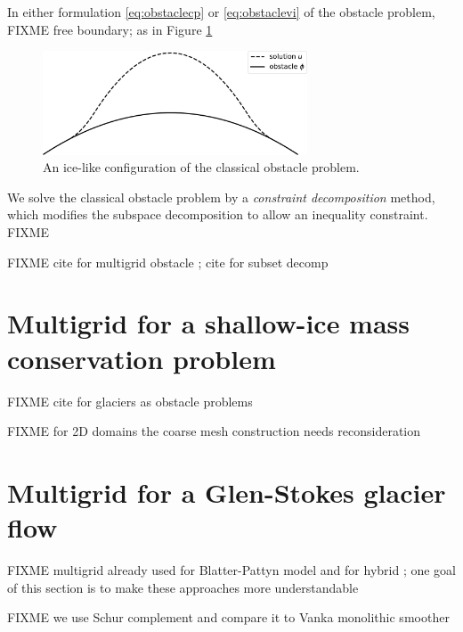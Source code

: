 \documentclass[letterpaper,final,12pt,reqno]{amsart}
\begin{document}
In either formulation \eqref{eq:obstaclecp} or \eqref{eq:obstaclevi} of the obstacle problem, FIXME free boundary; as in Figure \ref{fig:icelike}

\begin{figure}
\includegraphics[width=0.7\textwidth]{fixfigs/icelike.pdf}
\caption{An ice-like configuration of the classical obstacle problem.}
\label{fig:icelike}
\end{figure}

We solve the classical obstacle problem by a \emph{constraint decomposition} \cite{Tai2003} method, which modifies the subspace decomposition to allow an inequality constraint.  FIXME

FIXME cite for multigrid obstacle \cite{BrandtCryer1983,Bueler2021,GraeserKornhuber2009,Jouvetetal2013}; cite for subset decomp \cite{Tai2003}


\section{Multigrid for a shallow-ice mass conservation problem} \label{sec:sia}

FIXME cite for glaciers as obstacle problems \cite{Bueler2016,Bueler2020,Calvoetal2002,JouvetBueler2012}

FIXME for 2D domains the coarse mesh construction needs reconsideration

\section{Multigrid for a Glen-Stokes glacier flow} \label{sec:stokes}

FIXME multigrid already used for Blatter-Pattyn model \cite{BrownSmithAhmadia2013} and for hybrid \cite{Jouvetetal2013}; one goal of this section is to make these approaches more understandable

FIXME we use Schur complement \cite{Bueler2021,Elmanetal2014} and compare it to Vanka monolithic smoother \cite{Farrelletal2019}
\end{document}
